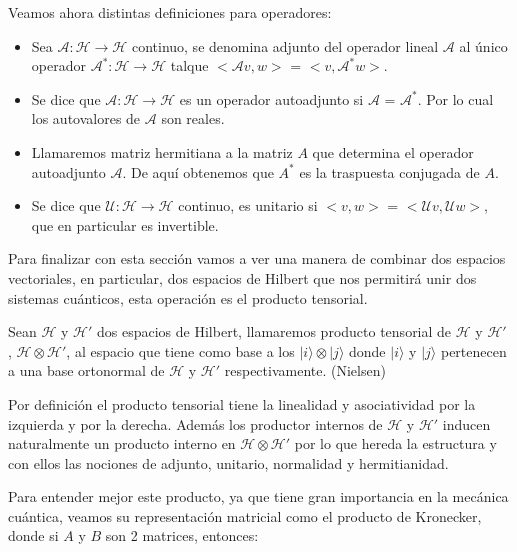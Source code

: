 \vspace{5pt}

Veamos ahora distintas definiciones para operadores:
\begin{itemize}
    \item Sea $\mathscr{A}:\mathscr{H} \rightarrow \mathscr{H}$ continuo, se denomina adjunto del operador lineal $\mathscr{A}$ al único operador   $\mathscr{A}^{*}:\mathscr{H} \rightarrow \mathscr{H}$ talque $<\mathscr{A}v,w>$ = $<v,\mathscr{A}^{*}w>$.
    \item Se dice que $\mathscr{A}:\mathscr{H} \rightarrow \mathscr{H}$ es un operador autoadjunto si $\mathscr{A}$ = $\mathscr{A}^{*}$. Por lo cual los autovalores de $\mathscr{A}$ son reales.
    \item Llamaremos matriz hermitiana a la matriz $A$ que determina el operador autoadjunto $\mathscr{A}$. De aquí obtenemos que $A^{*}$ es la traspuesta conjugada de $A$.
    \item Se dice que $\mathscr{U}:\mathscr{H} \rightarrow \mathscr{H}$  continuo, es unitario si $<v,w>$ = $<\mathscr{U}v,\mathscr{U}w>$, que en particular es invertible.
\end{itemize}

\vspace{5pt}

Para finalizar con esta sección vamos a ver una manera de combinar dos espacios vectoriales, en particular, dos espacios de Hilbert que nos permitirá unir dos sistemas cuánticos, esta operación es el producto tensorial.

\vspace{5pt}

Sean $\mathscr{H}$ y $\mathscr{H}'$ dos espacios de Hilbert, llamaremos producto tensorial de $\mathscr{H}$ y $\mathscr{H}'$ , $\mathscr{H} \otimes \mathscr{H}'$, al espacio que tiene como base a los $|i\rangle \otimes |j\rangle$ donde $|i\rangle$ y $|j\rangle$ pertenecen a una base ortonormal de $\mathscr{H}$ y $\mathscr{H}'$ respectivamente. (Nielsen)

\vspace{5pt}
Por definición el producto tensorial tiene la linealidad y asociatividad por la izquierda y por la derecha. Además los productor internos de $\mathscr{H}$ y $\mathscr{H}'$ inducen naturalmente un producto interno en $\mathscr{H} \otimes \mathscr{H}'$ por lo que hereda la estructura y con ellos las nociones de adjunto, unitario, normalidad y hermitianidad.

\vspace{5pt}
Para entender mejor este producto, ya que tiene gran importancia en la mecánica cuántica, veamos su representación matricial como el producto de Kronecker, donde si $A$ y $B$ son 2 matrices, entonces:

